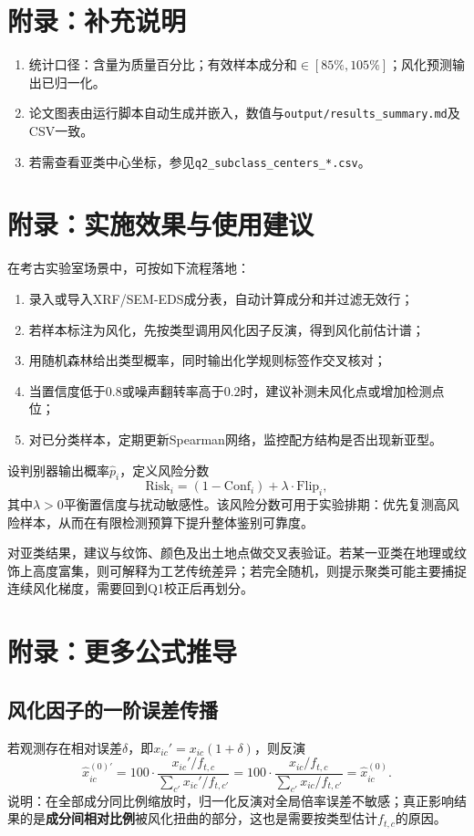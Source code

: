 \documentclass[UTF8,a4paper,12pt]{ctexart}
\begin{document}
\section{附录：补充说明}
\begin{enumerate}[leftmargin=2em]
\item 统计口径：含量为质量百分比；有效样本成分和$\in[85\%,105\%]$；风化预测输出已归一化。
\item 论文图表由运行脚本自动生成并嵌入，数值与\texttt{output/results\_summary.md}及CSV一致。
\item 若需查看亚类中心坐标，参见\texttt{q2\_subclass\_centers\_*.csv}。
\end{enumerate}

\section{附录：实施效果与使用建议}
在考古实验室场景中，可按如下流程落地：
\begin{enumerate}[leftmargin=2em]
\item 录入或导入XRF/SEM-EDS成分表，自动计算成分和并过滤无效行；
\item 若样本标注为风化，先按类型调用风化因子反演，得到风化前估计谱；
\item 用随机森林给出类型概率，同时输出化学规则标签作交叉核对；
\item 当置信度低于$0.8$或噪声翻转率高于$0.2$时，建议补测未风化点或增加检测点位；
\item 对已分类样本，定期更新Spearman网络，监控配方结构是否出现新亚型。
\end{enumerate}

设判别器输出概率$\hat p_i$，定义风险分数
\begin{equation}
\mathrm{Risk}_i=(1-\mathrm{Conf}_i)+ \lambda \cdot \mathrm{Flip}_i,
\end{equation}
其中$\lambda>0$平衡置信度与扰动敏感性。该风险分数可用于实验排期：优先复测高风险样本，从而在有限检测预算下提升整体鉴别可靠度。

对亚类结果，建议与纹饰、颜色及出土地点做交叉表验证。若某一亚类在地理或纹饰上高度富集，则可解释为工艺传统差异；若完全随机，则提示聚类可能主要捕捉连续风化梯度，需要回到Q1校正后再划分。

\section{附录：更多公式推导}
\subsection{风化因子的一阶误差传播}
若观测存在相对误差$\delta$，即$x_{ic}'=x_{ic}(1+\delta)$，则反演
\begin{equation}
\hat x_{ic}^{(0)\prime}
=100\cdot\frac{x_{ic}'/f_{t,c}}{\sum_{c'}x_{ic}'/f_{t,c'}}
=100\cdot\frac{x_{ic}/f_{t,c}}{\sum_{c'}x_{ic}/f_{t,c'}}
=\hat x_{ic}^{(0)}.
\end{equation}
说明：在全部成分同比例缩放时，归一化反演对全局倍率误差不敏感；真正影响结果的是\textbf{成分间相对比例}被风化扭曲的部分，这也是需要按类型估计$f_{t,c}$的原因。
\end{document}
